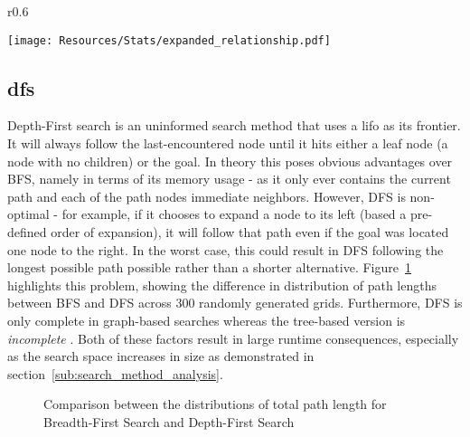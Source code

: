 \begin{wrapfigure}{r}{0.6\textwidth}
	\label{fig:expanded_relationship}
	\centerline{
		\texttt{[image: Resources/Stats/expanded\_relationship.pdf]}
	}
	\caption{Linear relationship between size of RNP grid and the number of nodes expanded for each search algorithm}
\end{wrapfigure}

\subsection{\texorpdfstring{\acrfull{dfs}}{DFS}} %
\label{sub:dfs}
Depth-First search is an uninformed search method that uses a \acrfull{lifo} as its frontier. It will always follow the last-encountered node until it hits either a leaf node (a node with no children) or the goal. In theory this poses obvious advantages over BFS, namely in terms of its memory usage - as it only ever contains the current path and each of the path nodes immediate neighbors. However, DFS is non-optimal - for example, if it chooses to expand a node to its left (based a pre-defined order of expansion), it will follow that path even if the goal was located one node to the right. In the worst case, this could result in DFS following the longest possible path possible rather than a shorter alternative. Figure~\ref{fig:dfs_bfs_length} highlights this problem, showing the difference in distribution of path lengths between BFS and DFS across 300 randomly generated grids. Furthermore, DFS is only complete in graph-based searches whereas the tree-based version is \textit{incomplete} \parencite[86]{aiama}. Both of these factors result in large runtime consequences, especially as the search space increases in size as demonstrated in section~\ref{sub:search_method_analysis}.

\begin{figure}[H]
	\hfill
	\hfill
	\caption{Comparison between the distributions of total path length for Breadth-First Search and Depth-First Search}
	\label{fig:dfs_bfs_length}
\end{figure}

